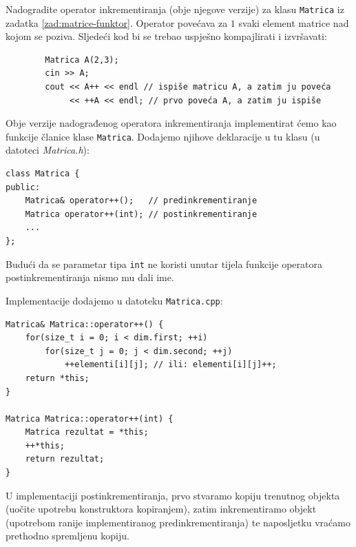 \begin{zadatak}\label{zad:matrica-inkrementiranje}
    Nadogradite operator inkrementiranja (obje njegove verzije) za klasu \texttt{Matrica} iz zadatka \ref{zad:matrice-funktor}.
    Operator povećava za $1$ svaki element matrice nad kojom se poziva.
    Sljedeći kod bi se trebao uspješno kompajlirati i izvršavati:
    \begin{verbatim}
        Matrica A(2,3);
        cin >> A;
        cout << A++ << endl // ispiše matricu A, a zatim ju poveća
             << ++A << endl; // prvo poveća A, a zatim ju ispiše
    \end{verbatim}
\end{zadatak}


\begin{rjesenje}
    Obje verzije nadograđenog operatora
    inkrementiranja implementirat ćemo kao funkcije članice klase \texttt{Matrica}.
    Dodajemo
    njihove deklaracije u tu klasu (u datoteci \textit{Matrica.h}):

    \begin{verbatim}    
class Matrica {
public:
    Matrica& operator++();   // predinkrementiranje
    Matrica operator++(int); // postinkrementiranje
    ...
};
    \end{verbatim}

    Budući da se parametar tipa \texttt{int} ne koristi unutar tijela funkcije
    operatora postinkrementiranja
    nismo mu dali ime.
    \medskip
    
    Implementacije dodajemo u datoteku \texttt{Matrica.cpp}:
    \begin{verbatim}    
Matrica& Matrica::operator++() {
    for(size_t i = 0; i < dim.first; ++i)
        for(size_t j = 0; j < dim.second; ++j)
            ++elementi[i][j]; // ili: elementi[i][j]++;
    return *this;
}
    
Matrica Matrica::operator++(int) {
    Matrica rezultat = *this;
    ++*this;
    return rezultat;
}
    \end{verbatim}

    U implementaciji postinkrementiranja,
    prvo stvaramo kopiju trenutnog objekta
    (uočite upotrebu konstruktora kopiranjem),
    zatim inkrementiramo objekt
    (upotrebom ranije implementiranog predinkrementiranja)
    te naposljetku vraćamo prethodno spremljenu kopiju.
\end{rjesenje}

